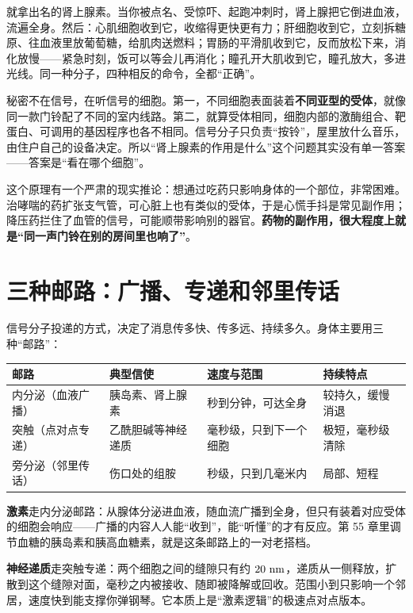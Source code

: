 就拿出名的肾上腺素。当你被点名、受惊吓、起跑冲刺时，肾上腺把它倒进血液，流遍全身。然后：心肌细胞收到它，收缩得更快更有力；肝细胞收到它，立刻拆糖原、往血液里放葡萄糖，给肌肉送燃料；胃肠的平滑肌收到它，反而放松下来，消化放慢——紧急时刻，饭可以等会儿再消化；瞳孔开大肌收到它，瞳孔放大，多进光线。同一种分子，四种相反的命令，全都“正确”。

秘密不在信号，在听信号的细胞。第一，不同细胞表面装着\textbf{不同亚型的受体}，就像同一款门铃配了不同的室内线路。第二，就算受体相同，细胞内部的激酶组合、靶蛋白、可调用的基因程序也各不相同。信号分子只负责“按铃”，屋里放什么音乐，由住户自己的设备决定。所以“肾上腺素的作用是什么”这个问题其实没有单一答案——答案是“看在哪个细胞”。

这个原理有一个严肃的现实推论：想通过吃药只影响身体的一个部位，非常困难。治哮喘的药扩张支气管，可心脏上也有类似的受体，于是心慌手抖是常见副作用；降压药拦住了血管的信号，可能顺带影响别的器官。\textbf{药物的副作用，很大程度上就是“同一声门铃在别的房间里也响了”}。

\section{三种邮路：广播、专递和邻里传话}

信号分子投递的方式，决定了消息传多快、传多远、持续多久。身体主要用三种“邮路”：

\begin{table}[htbp]
\centering
\begin{tabular}{llll}
\toprule
邮路 & 典型信使 & 速度与范围 & 持续特点 \\
\midrule
内分泌（血液广播） & 胰岛素、肾上腺素 & 秒到分钟，可达全身 & 较持久，缓慢消退 \\
突触（点对点专递） & 乙酰胆碱等神经递质 & 毫秒级，只到下一个细胞 & 极短，毫秒级清除 \\
旁分泌（邻里传话） & 伤口处的组胺 & 秒级，只到几毫米内 & 局部、短程 \\
\bottomrule
\end{tabular}
\end{table}

\textbf{激素}走内分泌邮路：从腺体分泌进血液，随血流广播到全身，但只有装着对应受体的细胞会响应——广播的内容人人能“收到”，能“听懂”的才有反应。第 55 章里调节血糖的胰岛素和胰高血糖素，就是这条邮路上的一对老搭档。

\textbf{神经递质}走突触专递：两个细胞之间的缝隙只有约 $20\ \mathrm{nm}$，递质从一侧释放，扩散到这个缝隙对面，毫秒之内被接收、随即被降解或回收。范围小到只影响一个邻居，速度快到能支撑你弹钢琴。它本质上是“激素逻辑”的极速点对点版本。

